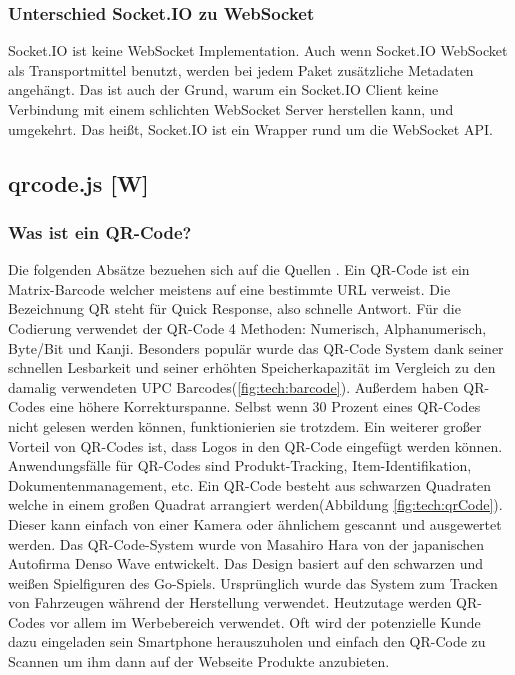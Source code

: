 \subsubsection{Unterschied Socket.IO zu WebSocket}
Socket.IO ist keine WebSocket Implementation. Auch wenn Socket.IO WebSocket als Transportmittel benutzt, werden bei jedem Paket zusätzliche Metadaten angehängt. Das ist auch der Grund, warum
ein Socket.IO Client keine Verbindung mit einem schlichten WebSocket Server herstellen kann, und umgekehrt.
Das heißt, Socket.IO ist ein Wrapper rund um die WebSocket API. \cite{socketio}


\subsection{qrcode.js [W]}

\subsubsection{Was ist ein QR-Code?}
Die folgenden Absätze bezuehen sich auf die Quellen \cite{qrCodeWiki} \cite{qrCode.js}.
Ein QR-Code ist ein Matrix-Barcode welcher meistens auf eine bestimmte URL verweist. Die Bezeichnung QR steht für Quick Response,
also schnelle Antwort. Für die Codierung verwendet der QR-Code 4 Methoden: Numerisch, Alphanumerisch, Byte/Bit und Kanji.
Besonders populär wurde das QR-Code System dank seiner
schnellen Lesbarkeit und seiner erhöhten Speicherkapazität im Vergleich zu den
damalig verwendeten UPC Barcodes(\ref{fig:tech:barcode}). Außerdem haben QR-Codes eine höhere Korrekturspanne. Selbst wenn 30 Prozent eines QR-Codes nicht gelesen werden können, funktionierien sie trotzdem. Ein weiterer großer Vorteil von QR-Codes ist, dass Logos in den QR-Code eingefügt werden können. Anwendungsfälle für QR-Codes sind Produkt-Tracking, Item-Identifikation, Dokumentenmanagement, etc.
Ein QR-Code besteht aus schwarzen Quadraten welche in einem großen Quadrat arrangiert werden(Abbildung \ref{fig:tech:qrCode}).
Dieser kann einfach von einer Kamera oder ähnlichem gescannt und ausgewertet werden.
Das QR-Code-System wurde von Masahiro Hara von der japanischen Autofirma Denso Wave entwickelt.
Das Design basiert auf den schwarzen und weißen Spielfiguren des Go-Spiels.
Ursprünglich wurde das System zum Tracken von Fahrzeugen während der Herstellung verwendet.
Heutzutage werden QR-Codes vor allem im Werbebereich verwendet. Oft wird der
potenzielle Kunde dazu eingeladen  sein Smartphone herauszuholen und einfach den QR-Code zu Scannen um
ihm dann auf der Webseite Produkte anzubieten. 

